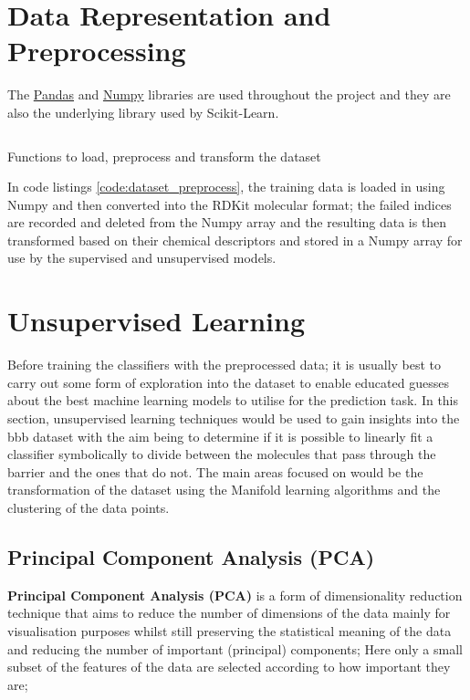 \documentclass[a4paper,12pt]{report}
\begin{document}
	\section{Data Representation and Preprocessing}
	The \href{http://pandas.pydata.org/}{Pandas} and \href{http://www.numpy.org/}{Numpy} libraries are used throughout the project and they are also the underlying library used by Scikit-Learn. 
		\begin{listing}[!htbp]
			\inputminted[breaklines=true,breakautoindent=true,linenos=true]{python}{source_code/dataset.py}
			\caption{Functions to load, preprocess and transform the dataset}
			\label{code:dataset_preprocess}
		\end{listing}
	In code listings \ref{code:dataset_preprocess}, the training data is loaded in using Numpy and then converted into the RDKit molecular format; the failed indices are recorded and deleted from the Numpy array and the resulting data is then transformed based on their chemical descriptors and stored in a Numpy array for use by the supervised and unsupervised models.
	
	
	
	
	
	\section{Unsupervised Learning}
	Before training the classifiers with the preprocessed data; it is usually best to carry out some form of exploration into the dataset to enable educated guesses about the best machine learning models to utilise for the prediction task. In this section, unsupervised learning techniques would be used to gain insights into the bbb dataset with the aim being to determine if it is possible to linearly fit a classifier symbolically to divide between the molecules that pass through the barrier and the ones that do not. The main areas focused on would be the transformation of the dataset using the Manifold learning algorithms and the clustering of the data points.
	
		\subsection{Principal Component Analysis (PCA)}
		\textbf{Principal Component Analysis (PCA)} is a form of dimensionality reduction technique that aims to reduce the number of dimensions of the data mainly for visualisation purposes whilst still preserving the statistical meaning of the data and reducing the number of important (principal) components; Here only a small subset of the features of the data are selected according to how important they are; 
		
\end{document}
